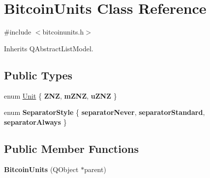 \hypertarget{class_bitcoin_units}{}\section{Bitcoin\+Units Class Reference}
\label{class_bitcoin_units}


{\ttfamily \#include $<$bitcoinunits.\+h$>$}



Inherits Q\+Abstract\+List\+Model.

\subsection*{Public Types}
\begin{DoxyCompactItemize}
\item 
enum \mbox{\hyperlink{class_bitcoin_units_ae41018ba530b4c8bdc74fd163709fb9d}{Unit}} \{ {\bfseries Z\+NZ}, 
{\bfseries m\+Z\+NZ}, 
{\bfseries u\+Z\+NZ}
 \}
\item 
\mbox{\label{class_bitcoin_units_a5151919ed4f75e0597047b0287b9ebf8}} 
enum {\bfseries Separator\+Style} \{ {\bfseries separator\+Never}, 
{\bfseries separator\+Standard}, 
{\bfseries separator\+Always}
 \}
\end{DoxyCompactItemize}
\subsection*{Public Member Functions}
\begin{DoxyCompactItemize}
\item 
\mbox{\label{class_bitcoin_units_ae4ca04589b255e9fc4c8dd28c56a7347}} 
{\bfseries Bitcoin\+Units} (Q\+Object $\ast$parent)
\end{DoxyCompactItemize}
